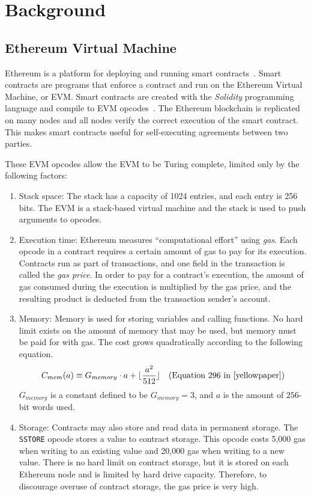 \documentclass[12pt]{article}
\begin{document}
\section{Background}

\subsection{Ethereum Virtual Machine}

Ethereum is a platform for deploying and running smart contracts~\cite{yellowpaper}. Smart contracts are programs that enforce a contract and run on the Ethereum Virtual Machine, or EVM. Smart contracts are created with the \emph{Solidity} programming language and compile to EVM opcodes~\cite{solidity}. The Ethereum blockchain is replicated on many nodes and all nodes verify the correct execution of the smart contract. This makes smart contracts useful for self-executing agreements between two parties.

These EVM opcodes allow the EVM to be Turing complete, limited only by the following factors:
\begin{enumerate}
  \item Stack space: The stack has a capacity of 1024 entries, and each entry is 256 bits. The EVM is a stack-based virtual machine and the stack is used to push arguments to opcodes.
  \item Execution time: Ethereum measures ``computational effort'' using \emph{gas}. Each opcode in a contract requires a certain amount of gas to pay for its execution. Contracts run as part of transactions, and one field in the transaction is called the \emph{gas price}. In order to pay for a contract's execution, the amount of gas consumed during the execution is multiplied by the gas price, and the resulting product is deducted from the transaction sender's account.
  \item Memory: Memory is used for storing variables and calling functions. No hard limit exists on the amount of memory that may be used, but memory must be paid for with gas. The cost grows quadratically according to the following equation.
  \begin{align*}
    C_{mem}(a) &\equiv G_{memory} \cdot a + \lfloor \frac{a^2}{512} \rfloor  & \text{(Equation 296 in~\cite{yellowpaper})}\\
  \end{align*}
  $G_{memory}$ is a constant defined to be $G_{memory} = 3$, and $a$ is the amount of $256$-bit words used.
  \item Storage: Contracts may also store and read data in permanent storage. The \texttt{SSTORE} opcode stores a value to contract storage. This opcode costs 5,000 gas when writing to an existing value and 20,000 gas when writing to a new value. There is no hard limit on contract storage, but it is stored on each Ethereum node and is limited by hard drive capacity. Therefore, to discourage overuse of contract storage, the gas price is very high.
\end{enumerate}
\end{document}
